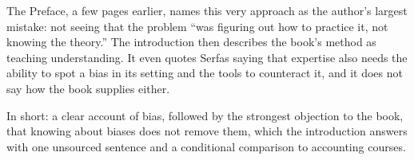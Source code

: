 \begin{afterword}
The Preface, a few pages earlier, names this very approach as the author's largest mistake: not seeing that the problem ``was figuring out how to practice it, not knowing the theory.'' The introduction then describes the book's method as teaching understanding. It even quotes Serfas saying that expertise also needs the ability to spot a bias in its setting and the tools to counteract it, and it does not say how the book supplies either.

In short: a clear account of bias, followed by the strongest objection to the book, that knowing about biases does not remove them, which the introduction answers with one unsourced sentence and a conditional comparison to accounting courses.
\end{afterword}
